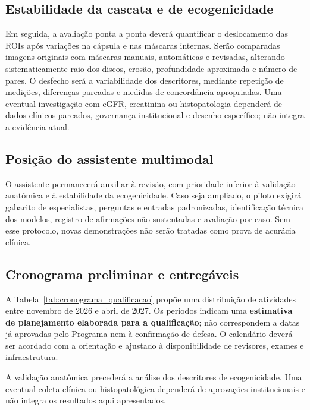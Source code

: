 \documentclass[12pt]{article}
\newif\ifversaoqualificacao
\begin{document}
\subsection{Estabilidade da cascata e de ecogenicidade}
Em seguida, a avaliação ponta a ponta deverá quantificar o deslocamento das ROIs após variações na cápsula e nas máscaras internas. Serão comparadas imagens originais com máscaras manuais, automáticas e revisadas, alterando sistematicamente raio dos discos, erosão, profundidade aproximada e número de pares. O desfecho será a variabilidade dos descritores, mediante repetição de medições, diferenças pareadas e medidas de concordância apropriadas. Uma eventual investigação com eGFR, creatinina ou histopatologia dependerá de dados clínicos pareados, governança institucional e desenho específico; não integra a evidência atual.

\subsection{Posição do assistente multimodal}
O assistente permanecerá auxiliar à revisão, com prioridade inferior à validação anatômica e à estabilidade da ecogenicidade. Caso seja ampliado, o piloto exigirá gabarito de especialistas, perguntas e entradas padronizadas, identificação técnica dos modelos, registro de afirmações não sustentadas e avaliação por caso. Sem esse protocolo, novas demonstrações não serão tratadas como prova de acurácia clínica.

\ifversaoqualificacao
\subsection{Cronograma preliminar e entregáveis}
A Tabela~\ref{tab:cronograma_qualificacao} propõe uma distribuição de atividades
entre novembro de 2026 e abril de 2027. Os períodos indicam uma \textbf{estimativa
de planejamento elaborada para a qualificação}; não correspondem a datas já
aprovadas pelo Programa nem à confirmação de defesa. O calendário deverá ser
acordado com a orientação e ajustado à disponibilidade de revisores, exames e
infraestrutura.

A validação anatômica precederá a análise dos descritores de ecogenicidade. Uma eventual coleta clínica ou histopatológica dependerá de aprovações institucionais e não integra os resultados aqui apresentados.
\end{document}
